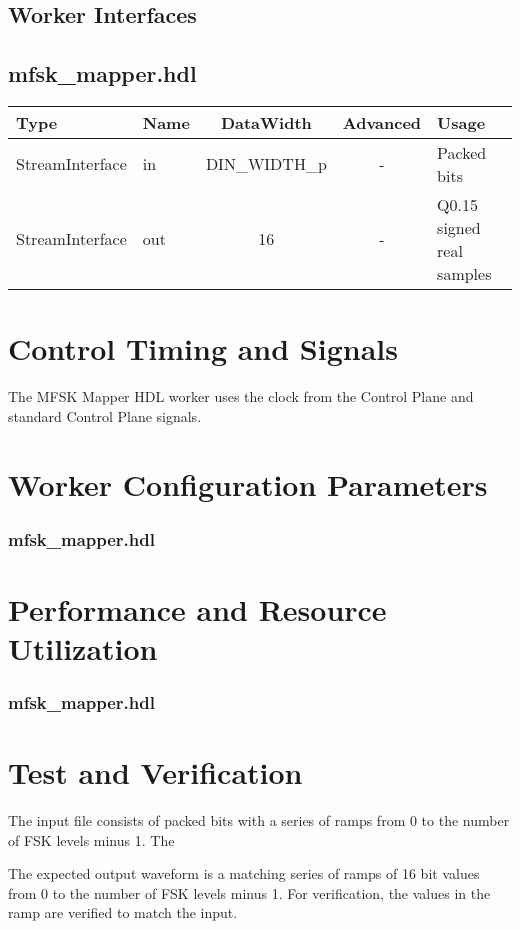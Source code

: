 \documentclass{article}
\def\comp{mfsk\_mapper}
\edef\ecomp{mfsk_mapper}
\def\Comp{MFSK Mapper}
\begin{document}
\begin{landscape}
	\section*{Worker Interfaces}
	\subsection*{\comp.hdl}
	\begin{scriptsize}
		\begin{tabular}{|M{2cm}|M{1.5cm}|c|c|p{12cm}|}
			\hline
			Type            & Name & DataWidth 		& Advanced  & Usage                 		\\
			\hline
			StreamInterface & in   & DIN\_WIDTH\_p	& - 		& Packed bits					\\
			\hline
			StreamInterface & out  & 16        		& -			& Q0.15 signed real samples 	\\
			\hline
		\end{tabular}
	\end{scriptsize}
\end{landscape}

\section*{Control Timing and Signals}
\begin{flushleft}
	The \Comp{} HDL worker uses the clock from the Control Plane and standard Control Plane signals.\\
\end{flushleft}

\begin{landscape}
\section*{Worker Configuration Parameters}
\subsubsection*{\comp.hdl}

\section*{Performance and Resource Utilization}
\subsubsection*{\comp.hdl}

\end{landscape}
\section*{Test and Verification}
\begin{flushleft}
	The input file consists of packed bits with a series of ramps from 0 to the number of FSK levels minus 1. The \medskip

	The expected output waveform is a matching series of ramps of 16 bit values from 0 to the number of FSK levels minus 1. For verification, the values in the ramp are verified to match the input.
\end{flushleft}
\end{document}
